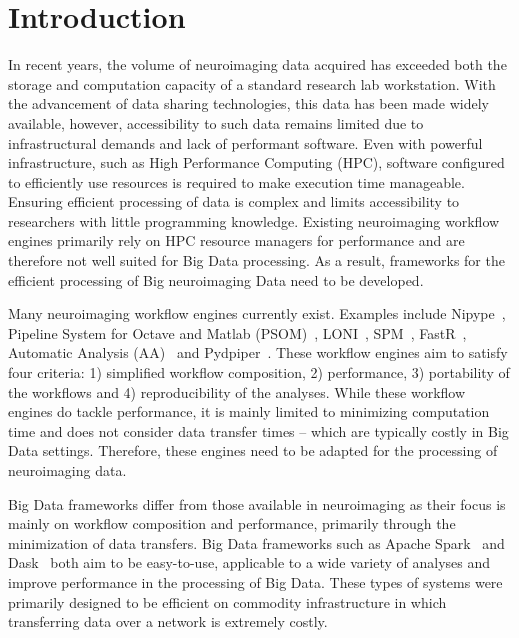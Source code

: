 \chapter{Introduction}

        In recent years, the volume of neuroimaging data acquired has exceeded
        both the storage and computation capacity of a standard research 
        lab workstation. With the advancement of data sharing technologies, 
        this data has been made widely available, however, accessibility to 
        such data remains limited due to infrastructural demands and lack of 
        performant software. Even with powerful infrastructure, such as High
        Performance Computing (HPC), software configured to 
        efficiently use resources is required to make execution time manageable. 
        Ensuring efficient processing of data is 
        complex and limits accessibility to researchers with little programming 
        knowledge. Existing neuroimaging workflow engines primarily rely on HPC
        resource managers for performance and are therefore not well suited for
        Big Data processing. As a result, frameworks for the efficient 
        processing of Big neuroimaging Data need to be developed.
        
        Many neuroimaging workflow engines currently exist. Examples include
        Nipype~\cite{nipype}, Pipeline System for Octave and Matlab 
        (PSOM)~\cite{10.3389/fninf.2012.00007}, LONI~\cite{REX20031033}, 
        SPM~\cite{spm}, FastR~\cite{10.3389/fict.2016.00015},
        Automatic Analysis (AA)~\cite{10.3389/fninf.2014.00090} and 
        Pydpiper~\cite{10.3389/fninf.2014.00067}. These 
        workflow engines aim to satisfy four criteria: 1) simplified
        workflow composition, 2) performance, 3) portability of the workflows 
        and 4) reproducibility of the analyses. While these workflow engines
        do tackle performance, it is mainly limited to minimizing computation
        time and does not consider data transfer times -- which are typically
        costly in Big Data settings. Therefore, these engines need to be adapted
        for the processing of neuroimaging data.

        Big Data frameworks differ from those available in neuroimaging as their
        focus is mainly on workflow composition and performance, primarily
        through the minimization of data transfers. Big Data frameworks such as
        Apache Spark~\cite{Zaharia:2016:ASU:3013530.2934664} and
        Dask~\cite{rocklin2015dask} both aim to be easy-to-use, applicable to a
        wide variety of analyses and improve performance in the processing of
        Big Data. These types of systems were primarily designed to be efficient
        on commodity infrastructure in which transferring data over a network is
        extremely costly.

